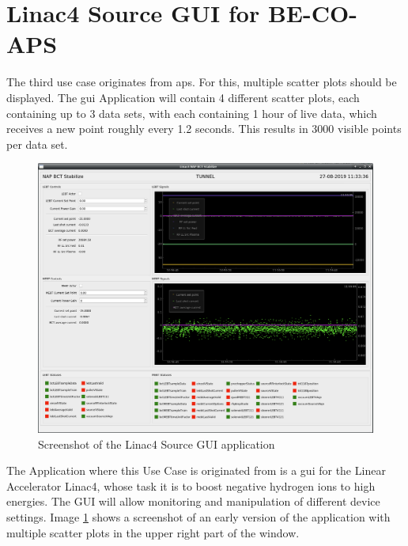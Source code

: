 \section{Linac4 Source GUI for BE-CO-APS}
\label{sec:usecases:linac}

The third use case originates from \gls{aps}. For this, multiple scatter plots
should be displayed. The \gls{gui} Application will contain 4 different scatter
plots, each containing up to 3 data sets, with each containing 1 hour of live
data, which receives a new point roughly every 1.2 seconds. This results in 3000
visible points per data set.

\begin{figure}[h]
    \centering
    \includegraphics[width=15cm]{resources/img/Linac4SourceGui}
    \caption{Screenshot of the Linac4 Source GUI application}
    \label{fig:linac4sourcegui}
\end{figure}

The Application where this Use Case is originated from is a \gls{gui} for the
Linear Accelerator Linac4, whose task it is to boost negative hydrogen ions to
high energies. The GUI will allow monitoring and manipulation of different
device settings. Image \ref{fig:linac4sourcegui} shows a screenshot of an early
version of the application with multiple scatter plots in the upper right part
of the window.
\cite{LinacFour, LinacFourGuiPres}

